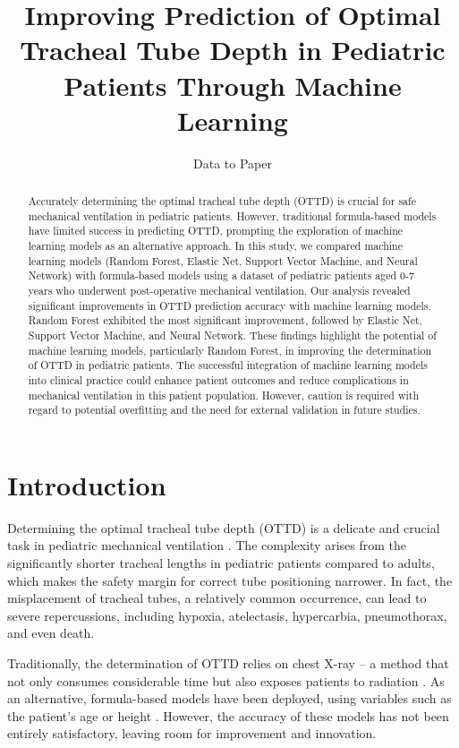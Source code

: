 \documentclass[11pt]{article}
\title{Improving Prediction of Optimal Tracheal Tube Depth in Pediatric Patients Through Machine Learning}
\author{Data to Paper}
\begin{document}
\maketitle
\begin{abstract}
Accurately determining the optimal tracheal tube depth (OTTD) is crucial for safe mechanical ventilation in pediatric patients. However, traditional formula-based models have limited success in predicting OTTD, prompting the exploration of machine learning models as an alternative approach. In this study, we compared machine learning models (Random Forest, Elastic Net, Support Vector Machine, and Neural Network) with formula-based models using a dataset of pediatric patients aged 0-7 years who underwent post-operative mechanical ventilation. Our analysis revealed significant improvements in OTTD prediction accuracy with machine learning models. Random Forest exhibited the most significant improvement, followed by Elastic Net, Support Vector Machine, and Neural Network. These findings highlight the potential of machine learning models, particularly Random Forest, in improving the determination of OTTD in pediatric patients. The successful integration of machine learning models into clinical practice could enhance patient outcomes and reduce complications in mechanical ventilation in this patient population. However, caution is required with regard to potential overfitting and the need for external validation in future studies.
\end{abstract}
\section*{Introduction}
Determining the optimal tracheal tube depth (OTTD) is a delicate and crucial task in pediatric mechanical ventilation \cite{Kerrey2009APC}. The complexity arises from the significantly shorter tracheal lengths in pediatric patients compared to adults, which makes the safety margin for correct tube positioning narrower. In fact, the misplacement of tracheal tubes, a relatively common occurrence, can lead to severe repercussions, including hypoxia, atelectasis, hypercarbia, pneumothorax, and even death.

Traditionally, the determination of OTTD relies on chest X-ray – a method that not only consumes considerable time but also exposes patients to radiation \cite{Spence2003DeepVS}. As an alternative, formula-based models have been deployed, using variables such as the patient's age or height \cite{Mariano2005ACO}. However, the accuracy of these models has not been entirely satisfactory, leaving room for improvement and innovation.
\end{document}
